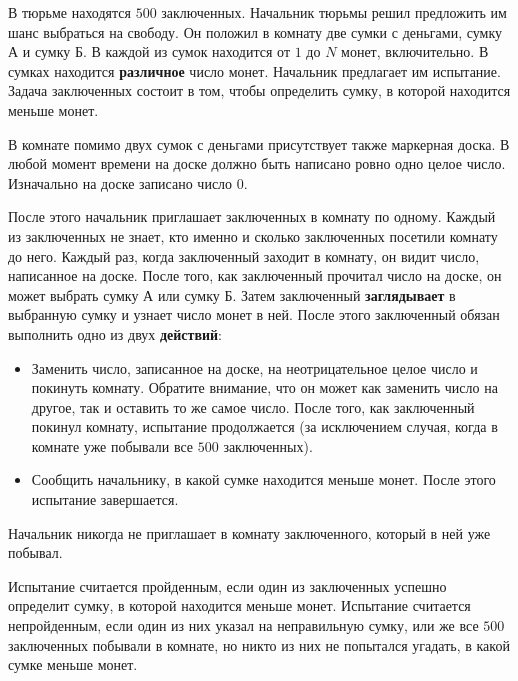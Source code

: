 В тюрьме находятся $500$ заключенных. Начальник тюрьмы решил предложить им шанс выбраться на свободу. Он положил в комнату две сумки с деньгами, сумку А и сумку Б. В каждой из сумок находится от $1$ до $N$ монет, включительно. В сумках находится \textbf{различное} число монет. Начальник предлагает им испытание. Задача заключенных состоит в том, чтобы определить сумку, в которой находится меньше монет.

В комнате помимо двух сумок с деньгами присутствует также маркерная доска. В любой момент времени на доске должно быть написано ровно одно целое число. Изначально на доске записано число $0$.

После этого начальник приглашает заключенных в комнату по одному. Каждый из заключенных не знает, кто именно и сколько заключенных посетили комнату до него.
Каждый раз, когда заключенный заходит в комнату, он видит число, написанное на доске. После того, как заключенный прочитал число на доске, он может выбрать сумку А или сумку Б. Затем заключенный \textbf{заглядывает} в выбранную сумку и узнает число монет в ней. После этого заключенный обязан выполнить одно из двух \textbf{действий}:
 \begin{itemize}
\item Заменить число, записанное на доске, на неотрицательное целое число и покинуть комнату. Обратите внимание, что он может как заменить число на другое, так и оставить то же самое число. После того, как заключенный покинул комнату, испытание продолжается (за исключением случая, когда в комнате уже побывали все $500$ заключенных).
\item Сообщить начальнику, в какой сумке находится меньше монет. После этого испытание завершается.
 \end{itemize}
Начальник никогда не приглашает в комнату заключенного, который в ней уже побывал.

Испытание считается пройденным, если один из заключенных успешно определит сумку, в которой находится меньше монет. Испытание считается непройденным, если один из них указал на неправильную сумку, или же все $500$ заключенных побывали в комнате, но никто из них не попытался угадать, в какой сумке меньше монет.

